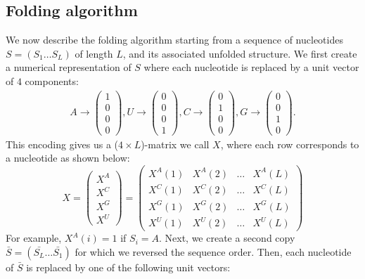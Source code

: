 \subsection{Folding algorithm}
We now describe the folding algorithm starting from a sequence of nucleotides \(S=(S_1\dots S_L)\) of length \(L\), and its associated unfolded structure. We first create a numerical representation of \(S\) where each nucleotide is replaced by a unit vector of $4$ components:
\begin{equation}
\begin{split}
A \rightarrow \begin{pmatrix} 1\\ 0\\ 0\\ 0 \end{pmatrix},
U \rightarrow \begin{pmatrix} 0\\ 0\\ 0\\ 1 \end{pmatrix},
C \rightarrow \begin{pmatrix} 0\\ 1\\ 0\\ 0 \end{pmatrix},
G \rightarrow \begin{pmatrix} 0\\ 0\\ 1\\ 0 \end{pmatrix}.
\end{split}
\end{equation}
This encoding gives us a (\(4 \times L\))-matrix we call \(X\), where each row corresponds to a nucleotide as shown below:
\begin{equation}
X = \begin{pmatrix} X^A\\ X^C\\ X^G\\ X^U \end{pmatrix} = \begin{pmatrix} X^A(1) &X^A(2) &\dots &X^A(L) \\ X^C(1) &X^C(2) &\dots &X^C(L)\\ X^G(1) &X^G(2) &\dots &X^G(L)\\ X^U(1) &X^U(2) &\dots &X^U(L) \end{pmatrix}
\end{equation}
For example, \(X^A(i) = 1\) if \(S_i = A\). Next, we create a second copy \(\bar{S}=(\bar{S_L}\dots \bar{S_1})\) for which we reversed the sequence order. Then, each nucleotide of \(\bar{S}\) is replaced by one of the following unit vectors:
